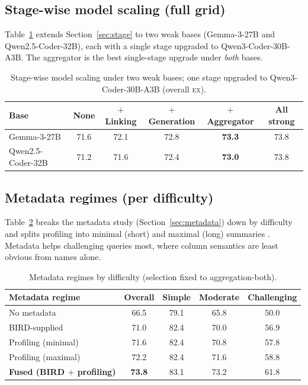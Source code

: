 \documentclass{article}
\newcommand{\ex}{\textsc{ex}\xspace}
\begin{document}
\subsection{Stage-wise model scaling (full grid)}
\label{app:stage}
Table~\ref{tab:s-stage} extends Section~\ref{sec:stage} to two weak bases (Gemma-3-27B and Qwen2.5-Coder-32B), each with a single stage upgraded to Qwen3-Coder-30B-A3B. The aggregator is the best single-stage upgrade under \emph{both} bases.

\begin{table}[h]
\centering\small
\caption{Stage-wise model scaling under two weak bases; one stage upgraded to Qwen3-Coder-30B-A3B (overall \ex).}
\label{tab:s-stage}
\begin{tabular}{@{}lccccc@{}}
\toprule
\textbf{Base} & \textbf{None} & \textbf{$+$Linking} & \textbf{$+$Generation} & \textbf{$+$Aggregator} & \textbf{All strong} \\
\midrule
Gemma-3-27B        & 71.6 & 72.1 & 72.8 & \textbf{73.3} & 73.8 \\
Qwen2.5-Coder-32B  & 71.2 & 71.6 & 72.4 & \textbf{73.0} & 73.8 \\
\bottomrule
\end{tabular}
\end{table}

\subsection{Metadata regimes (per difficulty)}
\label{app:meta}
Table~\ref{tab:s-meta} breaks the metadata study (Section~\ref{sec:metadata}) down by difficulty and splits profiling into minimal (short) and maximal (long) summaries \citep{shkapenyuk2025metadata}. Metadata helps challenging queries most, where column semantics are least obvious from names alone.

\begin{table}[h]
\centering\small
\caption{Metadata regimes by difficulty (selection fixed to aggregation-both).}
\label{tab:s-meta}
\begin{tabular}{@{}lcccc@{}}
\toprule
\textbf{Metadata regime} & \textbf{Overall} & \textbf{Simple} & \textbf{Moderate} & \textbf{Challenging} \\
\midrule
No metadata                   & 66.5 & 79.1 & 65.8 & 50.0 \\
BIRD-supplied                 & 71.0 & 82.4 & 70.0 & 56.9 \\
Profiling (minimal)           & 71.6 & 82.4 & 70.8 & 57.8 \\
Profiling (maximal)           & 72.2 & 82.4 & 71.6 & 58.8 \\
\textbf{Fused (BIRD $+$ profiling)} & \textbf{73.8} & 83.1 & 73.2 & 61.8 \\
\bottomrule
\end{tabular}
\end{table}
\end{document}
